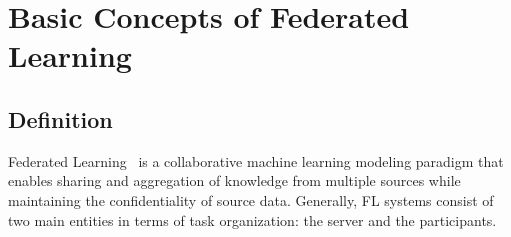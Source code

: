 \section{Basic Concepts of Federated Learning}
\label{sec:basic}
\subsection{Definition}
\label{sec:basicdefinition}
Federated Learning~\cite{IEEEstd3652, mcmahan2017communication} is a collaborative machine learning modeling paradigm that enables sharing and aggregation of knowledge from multiple sources while maintaining the confidentiality of source data.
Generally, FL systems consist of two main entities in terms of task organization: the server and the participants. 

